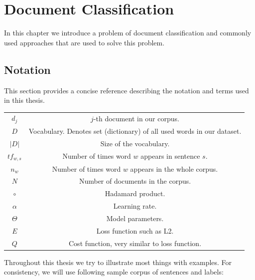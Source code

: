 \chapter{Document Classification}

    In this chapter we introduce a problem of document classification and commonly used approaches that are used to solve this problem.
    \* %
    

\section{Notation}

    This section provides a concise reference describing the notation and terms used in this thesis.
    
    \begin{table}[h]
        \centering
        \begin{tabular}{c c}
            $d_j$ & $j$-th document in our corpus.\\
            $D$ & Vocabulary. Denotes set (dictionary) of all used words in our dataset. \\
            $|D|$ & Size of the vocabulary. \\
            $tf_{w,s}$ & Number of times word $w$ appears in sentence $s$. \\
            $n_w$ & Number of times word $w$ appears in the whole corpus. \\
            $N$ & Number of documents in the corpus. \\
            $\circ$ & Hadamard product. \\
            $\alpha$ & Learning rate. \\
            $\Theta$ & Model parameters.\\
            $E$ & Loss function such as L2.\\
            $Q$ & Cost function, very similar to loss function.\\
            
        \end{tabular}
    \end{table}
    
    \* %
    \* %
    
    Throughout this thesis we try to illustrate most things with examples. 
    For consistency, we will use following sample corpus of sentences and labels:
    
